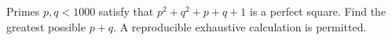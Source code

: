 Primes $p,q<1000$ satisfy that $p^2+q^2+p+q+1$ is a perfect square. Find the greatest possible $p+q$. A reproducible exhaustive calculation is permitted.
